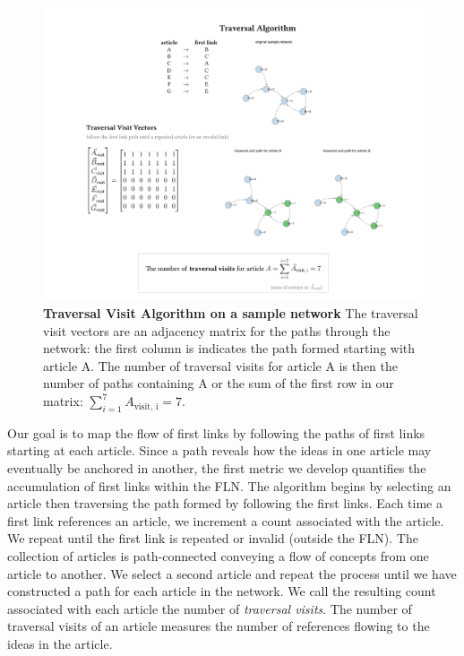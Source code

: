 \documentclass[pre,twocolumn,twoside,superscriptaddress,floatfix, aps, 10pt]{revtex4-1}
\begin{document}
\begin{figure}[tp!]
  \centering	
  \includegraphics[width=\textwidth]{graphics/traversal_visit_algo_figure.pdf}  
  \caption{
    \textbf{Traversal Visit Algorithm on a sample network}
     The traversal visit vectors are an adjacency matrix for the paths through the network: the first column is indicates the path formed starting with article A. The number of traversal visits for article A is then the number of paths containing A or the sum of the first row in our matrix:
     $\sum_{i=1}^7 A_{\text{visit, i}} = 7$.
  }
  \label{fig:Traversal Visits}
\end{figure}

Our goal is to map the flow of first links by following the paths of first links 
starting at each article. 
Since a path reveals how the ideas in one article may eventually be 
anchored in another, the first metric we develop quantifies the accumulation of first links 
within the FLN. 
The algorithm begins by selecting an article then traversing the path formed
by following the first links. Each time a first link references an article, we increment a count
associated with the article. 
We repeat until the first link is repeated or invalid (outside the FLN). 
The collection of articles is path-connected conveying a flow of concepts from one article to another. 
We select a second article and repeat the process until we have 
constructed a path for each article in the network. We call the resulting count associated with each article the number of {\it traversal visits}. The number of traversal visits of an article 
measures the number of references flowing to the ideas in the article. 
\end{document}
